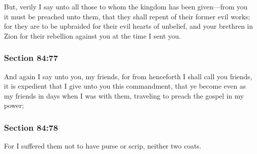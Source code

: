 		But, verily I say unto all those to whom the kingdom has been given---from you it must be preached unto them, that they shall repent of their former evil works; for they are to be upbraided for their evil hearts of unbelief, and your brethren in Zion for their rebellion against you at the time I sent you.


	\subsubsection{Section 84:77} %
		\label{DC84-77}

		And again I say unto you, my friends, for from henceforth I shall call you friends, it is expedient that I give unto you this commandment, that ye become even as my friends in days when I was with them, traveling to preach the gospel in my power;


	\subsubsection{Section 84:78} %
		\label{DC84-78}

		For I suffered them not to have purse or scrip, neither two coats.


